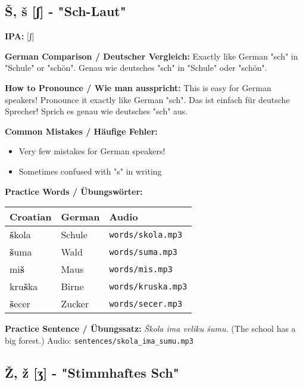 \subsection{Š, š [ʃ] - "Sch-Laut"}

\begin{tcolorbox}[colback=lightblue!30, colframe=croatianblue, title=\textbf{Š, š}]

\textbf{IPA:} [ʃ]

\textbf{German Comparison / Deutscher Vergleich:}
Exactly like German "sch" in "Schule" or "schön".
Genau wie deutsches "sch" in "Schule" oder "schön".

\textbf{How to Pronounce / Wie man ausspricht:}
This is easy for German speakers! Pronounce it exactly like German "sch".
Das ist einfach für deutsche Sprecher! Sprich es genau wie deutsches "sch" aus.

\textbf{Common Mistakes / Häufige Fehler:}
\begin{itemize}
    \item Very few mistakes for German speakers!
    \item Sometimes confused with "s" in writing
\end{itemize}

\textbf{Practice Words / Übungswörter:}
\begin{tabular}{lll}
\textbf{Croatian} & \textbf{German} & \textbf{Audio} \\
\midrule
\textbf{š}kola & Schule & \texttt{words/skola.mp3} \\
\textbf{š}uma & Wald & \texttt{words/suma.mp3} \\
mi\textbf{š} & Maus & \texttt{words/mis.mp3} \\
kru\textbf{š}ka & Birne & \texttt{words/kruska.mp3} \\
\textbf{š}ecer & Zucker & \texttt{words/secer.mp3} \\
\end{tabular}

\textbf{Practice Sentence / Übungssatz:}
\textit{Škola ima veliku šumu.}
(The school has a big forest.)
Audio: \texttt{sentences/skola\_ima\_sumu.mp3}

\end{tcolorbox}

\subsection{Ž, ž [ʒ] - "Stimmhaftes Sch"}

